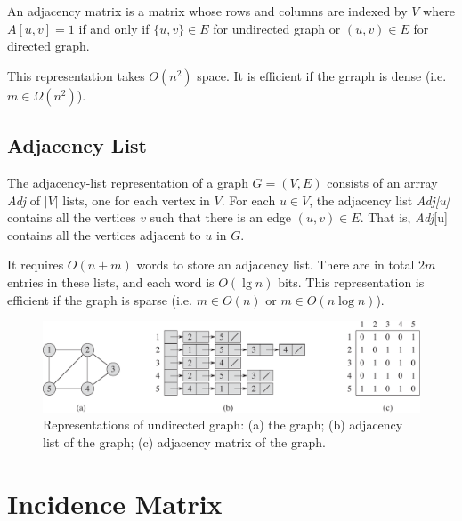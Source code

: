 \vspace{\parskip}

\begin{definition}
    An adjacency matrix is a matrix whose rows and columns are indexed by $V$ where $A[u,v]=1$ if and only if $\{u,v\} \in E$ for undirected graph or $(u,v) \in E$ for directed graph.
\end{definition}

This representation takes $O(n^2)$ space. It is efficient if the grraph is dense (i.e. $m \in \Omega(n^2)$).

\subsection{Adjacency List}

\vspace{\parskip}

\begin{definition} 
    The adjacency-list representation of a graph $G=(V,E)$ consists of an arrray \textit{Adj} of $|V|$ lists, one for each vertex in $V$. For each $u \in V$, the adjacency list \textit{Adj[u]} contains all the vertices $v$ such that there is an edge $(u,v) \in E$. That is, \textit{Adj}[u] contains all the vertices adjacent to $u$ in $G$.
\end{definition}

It requires $O(n+m)$ words to store an adjacency list. There are in total $2m$ entries in these lists, and each word is $O(\lg n)$ bits. This representation is efficient if the graph is sparse (i.e. $m \in O(n)$ or $m \in O(n \log n)$).

\begin{figure}[htbp]
    \centering
    \includegraphics[width=\linewidth]{figures/undirected_graph.pdf}
    \caption{Representations of undirected graph: (a) the graph; (b) adjacency list of the graph; (c) adjacency matrix of the graph.}
    \label{fig:graph-rep}
\end{figure}

\section{Incidence Matrix}


